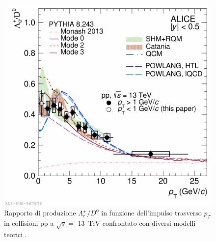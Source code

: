         \begin{figure}[h]
            \centering
            \includegraphics[width=0.65\linewidth]{res/fig/1-chapter/10-ALICE-pp13TeV.pdf}
            \caption{Rapporto di produzione $\Lambda_{c}^{+}/D^{0}$ in funzione dell'impulso trasverso $p_{T}$ in collisioni pp a $\sqrt{s} =$ \qty{13}{\tera \eV} confrontato con diversi modelli teorici \cite{ALICE_2023_pp13TeV}.}
            \label{fig:10-ALICE-pp13TeV}
        \end{figure}
